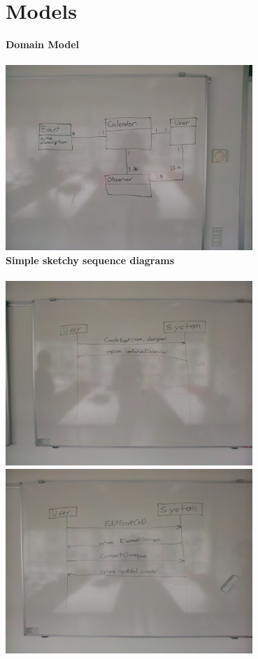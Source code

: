 \documentclass[a4paper,10pt,titlepage]{article}
\begin{document}
\section{Models}
\textbf{Domain Model}
\\ \\
\includegraphics[width=0.7\textwidth]{./domainmodel}\\[1cm] 
\textbf{Simple sketchy sequence diagrams }
\\ \\
\includegraphics[width=0.7\textwidth]{./ssd}\\[1cm] 
\includegraphics[width=0.7\textwidth]{./ssd2}\\[1cm] 
\end{document}

